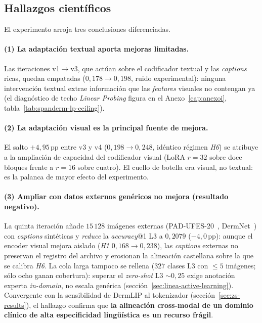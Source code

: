 \subsection{Hallazgos científicos}
\label{sec:spanderm-escala-especificidad}

El experimento arroja tres conclusiones diferenciadas.

\paragraph{(1) La adaptación textual aporta mejoras limitadas.}
Las iteraciones v1$\to$v3, que actúan sobre el codificador textual y
las \emph{captions} ricas, quedan empatadas ($0{,}178 \to 0{,}198$,
ruido experimental): ninguna intervención textual extrae información que
las \emph{features} visuales no contengan ya (el diagnóstico de techo
\emph{Linear Probing} figura en el Anexo~\ref{cap:anexoi},
tabla~\ref{tab:spanderm-lp-ceiling}).

\paragraph{(2) La adaptación visual es la principal fuente de mejora.}
El salto $+4{,}95$\,pp entre v3 y v4 ($0{,}198 \to 0{,}248$, idéntico
régimen \emph{H6}) se atribuye a la ampliación de capacidad del
codificador visual (LoRA $r=32$ sobre doce bloques frente a $r=16$ sobre
cuatro). El cuello de botella era visual, no textual: es la palanca de
mayor efecto del experimento.

\paragraph{(3) Ampliar con datos externos genéricos no mejora
(resultado negativo).} La quinta iteración añade $15\,128$ imágenes
externas (PAD-UFES-20~\cite{padufes}, DermNet~\cite{dermnet}) con
\emph{captions} sintéticas y \emph{reduce} la \emph{accuracy}@1 L3 a
$0{,}2079$ ($-4{,}0$\,pp): aunque el encoder visual mejora aislado
(\emph{H1} $0{,}168 \to 0{,}238$), las \emph{captions} externas no
preservan el registro del archivo y erosionan la alineación castellana
sobre la que se calibra \emph{H6}. La cola larga tampoco se rellena
($327$ clases L3 con $\leq 5$ imágenes; sólo ocho ganan cobertura):
superar el \emph{zero-shot} L3 $\sim 0{,}25$ exige anotación experta
\emph{in-domain}, no escala genérica
(sección~\ref{sec:linea-active-learning}). Convergente con la
sensibilidad de DermLIP al tokenizador
(sección~\ref{sec:zs-results}), el hallazgo confirma que \textbf{la
alineación cross-modal de un dominio clínico de alta especificidad
lingüística es un recurso frágil}.

